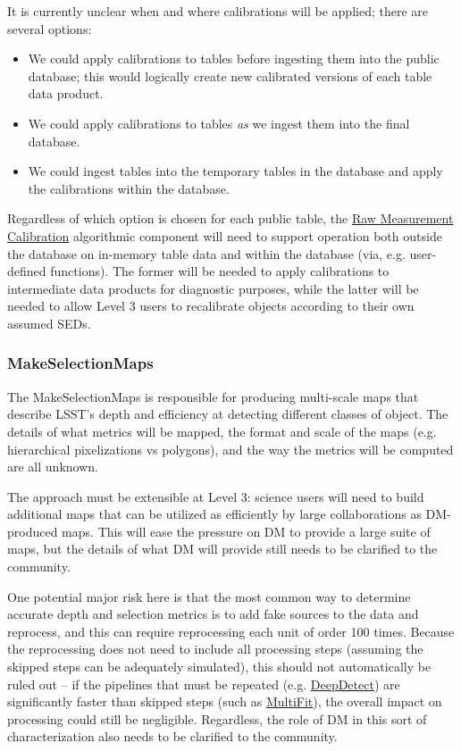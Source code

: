 It is currently unclear when and where calibrations will be applied; there are several options:
\begin{itemize}
\item We could apply calibrations to tables before ingesting them into the public database; this would logically create new calibrated versions of each table data product.
\item We could apply calibrations to tables \emph{as} we ingest them into the final database.
\item We could ingest tables into the temporary tables in the database and apply the calibrations within the database.
\end{itemize}
Regardless of which option is chosen for each public table, the \hyperref[sec:acRawMeasurementCalibration]{Raw Measurement Calibration} algorithmic component will need to support operation both outside the database on in-memory table data and within the database (via, e.g. user-defined functions).  The former will be needed to apply calibrations to intermediate data products for diagnostic purposes, while the latter will be needed to allow Level 3 users to recalibrate objects according to their own assumed SEDs.

\subsubsection{MakeSelectionMaps}
\label{sec:drpMakeSelectionMaps}

The MakeSelectionMaps is responsible for producing multi-scale maps that describe LSST's depth and efficiency at detecting different classes of object.  The details of what metrics will be mapped, the format and scale of the maps (e.g. hierarchical pixelizations vs polygons), and the way the metrics will be computed are all unknown.

The approach must be extensible at Level 3: science users will need to build additional maps that can be utilized as efficiently by large collaborations as DM-produced maps.  This will ease the pressure on DM to provide a large suite of maps, but the details of what DM will provide still needs to be clarified to the community.

One potential major risk here is that the most common way to determine accurate depth and selection metrics is to add fake sources to the data and reprocess, and this can require reprocessing each unit of order 100 times.  Because the reprocessing does not need to include all processing steps (assuming the skipped steps can be adequately simulated), this should not automatically be ruled out -- if the pipelines that must be repeated (e.g. \hyperref[sec:drpDeepDetect]{DeepDetect}) are significantly faster than skipped steps (such as \hyperref[sec:drpMultiFit]{MultiFit}), the overall impact on processing could still be negligible.  Regardless, the role of DM in this sort of characterization also needs to be clarified to the community.

